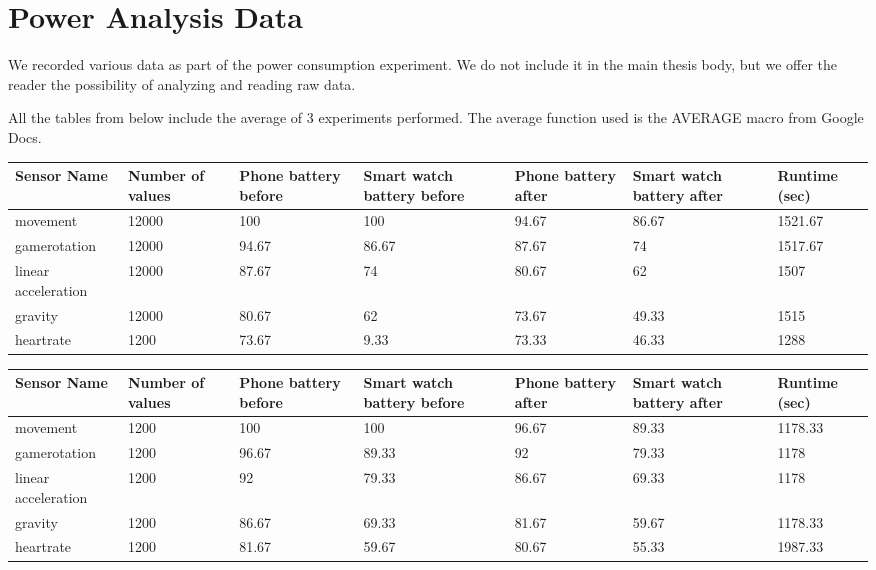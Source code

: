 
\chapter{Power Analysis Data} %

\label{AppendixPower} %


We recorded various data as part of the power consumption experiment. We do not include it in the main thesis body, but we offer the reader
the possibility of analyzing and reading raw data.

All the tables from below include the average of 3 experiments performed. The average function used is the AVERAGE macro from Google Docs.

\begin{center}

  \begin{tabular}{ |p{2.5cm}|p{1.5cm}|p{1.5cm}|p{1.5cm}|p{1.5cm}|p{1.5cm}|p{1.5cm}|}
  \hline
Sensor Name &Number of values &	Phone battery before &	Smart watch battery before &	Phone battery after	& Smart watch battery after &	Runtime (sec) \\
  \hline
movement 	& 	12000	& 100	& 100	&  94.67	 &  86.67 	& 1521.67 \\
gamerotation	 & 	12000	&	94.67	&	86.67	& 	87.67	&	 74	& 1517.67 \\
linear acceleration 	& 12000	&	87.67	&	74 	&	80.67	& 62	& 	1507 \\ 
gravity 	&	12000	&	80.67	&	62	     	&		73.67	& 	49.33	& 	1515 \\
heartrate & 	1200	&	73.67	&	9.33		&	73.33	& 	46.33	& 	1288 \\
  \hline
  \end{tabular}
   \label{tab:title1} 
\end{center}

\begin{center}
  \begin{tabular}{ |p{2.5cm}|p{1.5cm}|p{1.5cm}|p{1.5cm}|p{1.5cm}|p{1.5cm}|p{1.5cm}|}
  \hline
Sensor Name &Number of values &	Phone battery before &	Smart watch battery before &	Phone battery after	& Smart watch battery after &	Runtime (sec) \\
  \hline
movement 	& 	1200	& 100	& 100	& 96.67	& 89.33	&1178.33 \\
gamerotation	 & 1200	&96.67	& 89.33	& 92	& 79.33	& 1178  \\
linear acceleration 	& 1200	& 92	& 79.33	& 86.67	& 69.33	& 1178  \\ 
gravity 	&	1200	& 86.67	& 69.33	& 81.67	& 59.67	& 1178.33	 \\
heartrate & 	1200	& 81.67	& 59.67	& 80.67	& 55.33	& 1987.33 \\
  \hline
  \end{tabular}
     \label{tab:title2} 
\end{center}


